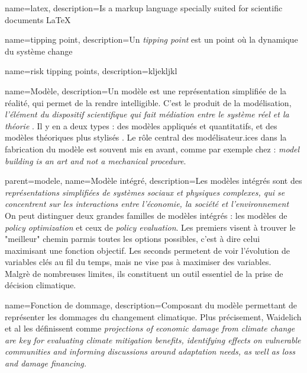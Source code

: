 {
    name=latex,
    description={Is a markup language specially suited 
    for scientific documents \LaTeX}
}


{
    name=tipping point, 
    description={Un \textit{tipping point} est un point où la dynamique du système change \cite{acemoglu_colonial_2001} }
}

{
    name=risk tipping points, 
    description={kljekljkl}
}

{
    name=Modèle, 
    description={Un modèle est une représentation simplifiée de la réalité, qui permet de la rendre intelligible. C'est le produit de la modélisation, \textit{l'élément du dispositif scientifique qui fait médiation entre le système réel et la théorie} \cite{briens_decroissance_2015}. Il y en a deux types : des modèles appliqués et quantitatifs, et des modèles théoriques plus stylisés \cite{briens_decroissance_2015}. Le rôle central des modélisateur.ices dans la fabrication du modèle est souvent mis en avant, comme par exemple chez \cite{beck_epistemic_2016} : \textit{model building is an art and not a mechanical procedure}. \\}
}

{
    parent=modele,
    name=Modèle intégré, 
    description={Les modèles intégrés sont des \textit{représentations simplifiées de systèmes sociaux et physiques complexes, qui se concentrent sur les interactions entre l'économie, la société et l'environnement} \cite{intergovernmental_panel_on_climate_change_ipcc_annex_2023}  \\
    On peut distinguer deux grandes familles de modèles intégrés : les modèles de \textit{policy optimization} et ceux de \textit{policy evaluation}. Les premiers visent à trouver le "meilleur" chemin parmis toutes les options possibles, c'est à dire celui maximisant une fonction objectif. Les seconds permetent de voir l'évolution de variables clés au fil du temps, mais ne vise pas à maximiser des variables. \\
    Malgrè de nombreuses limites, ils constituent un outil essentiel de la prise de décision climatique.
    }
}

{
    name=Fonction de dommage, 
    description={Composant du modèle permettant de représenter les dommages du changement climatique. Plus précisement, Waidelich et al \cite{waidelich_climate_2024} les définissent comme \emph{projections of economic damage from climate change are key for evaluating climate mitigation benefits, identifying effects on vulnerable communities and informing discussions around adaptation needs, as well as loss and damage financing.}}
}

